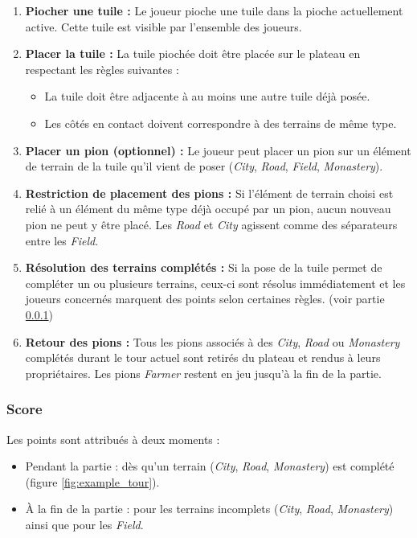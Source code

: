 \documentclass[11pt]{article}
\begin{document}
\begin{enumerate}
  \item \textbf{Piocher une tuile :}  
  Le joueur pioche une tuile dans la pioche actuellement active. Cette tuile est visible par l'ensemble des joueurs.

  \item \textbf{Placer la tuile :}  
  La tuile piochée doit être placée sur le plateau en respectant les règles suivantes :
  \begin{itemize}
    \item[-] La tuile doit être adjacente à au moins une autre tuile déjà posée.
    \item[-] Les côtés en contact doivent correspondre à des terrains de même type.
  \end{itemize}

  \item \textbf{Placer un pion (optionnel) :}  
  Le joueur peut placer un pion sur un élément de terrain de la tuile qu'il vient de poser (\textit{City}, \textit{Road}, \textit{Field}, \textit{Monastery}).

  \item \textbf{Restriction de placement des pions :}  
  Si l'élément de terrain choisi est relié à un élément du même type déjà occupé par un pion, aucun nouveau pion ne peut y être placé.
  Les \textit{Road} et \textit{City} agissent comme des séparateurs entre les \textit{Field}.

  \item \textbf{Résolution des terrains complétés :}  
  Si la pose de la tuile permet de compléter un ou plusieurs terrains, ceux-ci sont résolus immédiatement et les joueurs concernés marquent des points selon certaines règles. (voir partie \ref{subsubsec:score})

  \item \textbf{Retour des pions :}  
  Tous les pions associés à des \textit{City}, \textit{Road} ou \textit{Monastery} complétés durant le tour actuel sont retirés du plateau et rendus à leurs propriétaires. Les pions \textit{Farmer} restent en jeu jusqu'à la fin de la partie.

\end{enumerate}

\subsubsection{Score}
\label{subsubsec:score}
Les points sont attribués à deux moments :
\begin{itemize}
  \item[$\bullet$] Pendant la partie : dès qu'un terrain  (\textit{City}, \textit{Road}, \textit{Monastery}) est complété (figure \ref{fig:example_tour}).
  \item[$\bullet$] À la fin de la partie : pour les terrains incomplets (\textit{City}, \textit{Road}, \textit{Monastery}) ainsi que pour les \textit{Field}.
\end{itemize}
\end{document}
